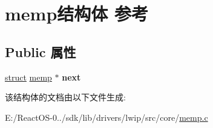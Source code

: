 \hypertarget{structmemp}{}\section{memp结构体 参考}
\label{structmemp}
\subsection*{Public 属性}
\begin{DoxyCompactItemize}
\item 
\mbox{\label{structmemp_a86abb86558e1cdee1bd2382f0323654d}} 
\hyperlink{interfacestruct}{struct} \hyperlink{structmemp}{memp} $\ast$ {\bfseries next}
\end{DoxyCompactItemize}


该结构体的文档由以下文件生成\+:\begin{DoxyCompactItemize}
\item 
E\+:/\+React\+O\+S-\/0../sdk/lib/drivers/lwip/src/core/\hyperlink{memp_8c}{memp.\+c}\end{DoxyCompactItemize}

